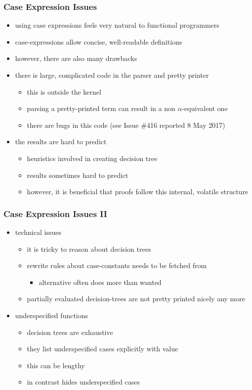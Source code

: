 \begin{frame}[fragile]
\frametitle{Case Expression Issues}

\begin{itemize}
\item using case expressions feels very natural to functional programmers
\item case-expressions allow concise, well-readable definitions
\item however, there are also many drawbacks
\item there is large, complicated code in the parser and pretty printer
\begin{itemize}
\item this is outside the kernel
\item parsing a pretty-printed term can result in a non $\alpha$-equivalent one
\item there are bugs in this code (see \eg Issue \#416 reported 8 May 2017)
\end{itemize}
\item the results are hard to predict
\begin{itemize}
\item heuristics involved in creating decision tree
\item results sometimes hard to predict
\item however, it is beneficial that proofs follow this internal, volatile structure
\end{itemize} 
\end{itemize}
\end{frame}


\begin{frame}[fragile]
\frametitle{Case Expression Issues II}

\begin{itemize}
\item technical issues
\begin{itemize}
\item it is tricky to reason about decision trees
\item rewrite rules about case-constants needs to be fetched from 
\begin{itemize}
\item alternative  often does more than wanted
\end{itemize}
\item partially evaluated decision-trees are not pretty printed nicely any more
\end{itemize}
\item underspecified functions
\begin{itemize}
\item decision trees are exhaustive
\item they list underspecified cases explicitly with value 
\item this can be lengthy
\item {} in contrast hides underspecified cases
\end{itemize}
\end{itemize}

\end{frame}


